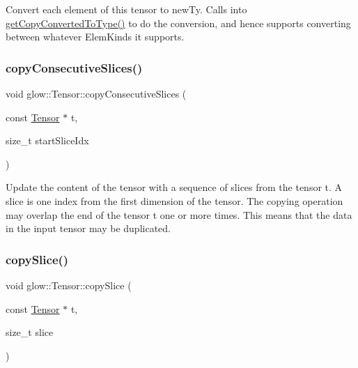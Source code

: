 Convert each element of this tensor to {\ttfamily new\+Ty}. Calls into \hyperlink{classglow_1_1_tensor_a5a65f889cbe5429225fe9d2ffe431a38}{get\+Copy\+Converted\+To\+Type()} to do the conversion, and hence supports converting between whatever Elem\+Kinds it supports. \mbox{\label{classglow_1_1_tensor_a66a32f8e59470dcda68232cbb1a05399}} 
\subsubsection{\texorpdfstring{copy\+Consecutive\+Slices()}{copyConsecutiveSlices()}}
{\footnotesize\ttfamily void glow\+::\+Tensor\+::copy\+Consecutive\+Slices (\begin{DoxyParamCaption}\item[{const \hyperlink{classglow_1_1_tensor}{Tensor} $\ast$}]{t,  }\item[{size\+\_\+t}]{start\+Slice\+Idx }\end{DoxyParamCaption})\hspace{0.3cm}{\ttfamily [inline]}}

Update the content of the tensor with a sequence of slices from the tensor {\ttfamily t}. A slice is one index from the first dimension of the tensor. The copying operation may overlap the end of the tensor {\ttfamily t} one or more times. This means that the data in the input tensor may be duplicated. \mbox{\label{classglow_1_1_tensor_a2859b4783c2e9c2a661d5d52754147df}} 
\subsubsection{\texorpdfstring{copy\+Slice()}{copySlice()}}
{\footnotesize\ttfamily void glow\+::\+Tensor\+::copy\+Slice (\begin{DoxyParamCaption}\item[{const \hyperlink{classglow_1_1_tensor}{Tensor} $\ast$}]{t,  }\item[{size\+\_\+t}]{slice }\end{DoxyParamCaption})\hspace{0.3cm}{\ttfamily [inline]}}

